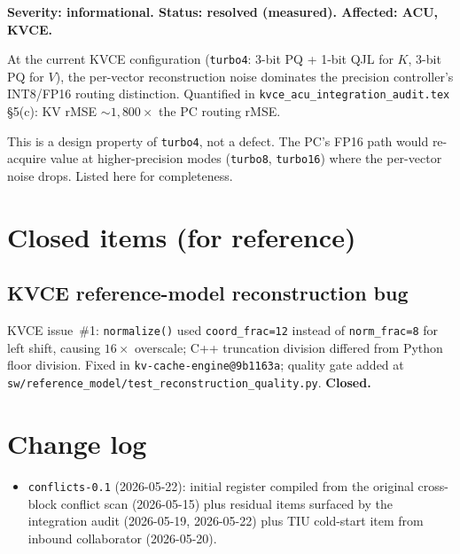 \documentclass[11pt]{article}
\begin{document}
\textbf{Severity: informational. Status: resolved (measured). Affected: ACU, KVCE.}

At the current KVCE configuration (\texttt{turbo4}: 3-bit PQ +
1-bit QJL for $K$, 3-bit PQ for $V$), the per-vector reconstruction
noise dominates the precision controller's INT8/FP16 routing
distinction. Quantified in
\texttt{kvce\_acu\_integration\_audit.tex} \S5(c): KV rMSE
$\sim 1{,}800\times$ the PC routing rMSE.

This is a design property of \texttt{turbo4}, not a defect. The
PC's FP16 path would re-acquire value at higher-precision modes
(\texttt{turbo8}, \texttt{turbo16}) where the per-vector noise
drops. Listed here for completeness.

\section{Closed items (for reference)}
\label{sec:closed}

\subsection*{KVCE reference-model reconstruction bug}

KVCE issue~\#1: \texttt{normalize()} used \texttt{coord\_frac=12}
instead of \texttt{norm\_frac=8} for left shift, causing $16\times$
overscale; C++ truncation division differed from Python
floor division. Fixed in \texttt{kv-cache-engine@9b1163a}; quality
gate added at \texttt{sw/reference\_model/test\_reconstruction\_quality.py}.
\textbf{Closed.}

\section*{Change log}

\begin{itemize}
\item \texttt{conflicts-0.1} (2026-05-22): initial register compiled
from the original cross-block conflict scan
(2026-05-15) plus residual items surfaced by the integration audit
(2026-05-19, 2026-05-22) plus TIU cold-start item from inbound
collaborator (2026-05-20).
\end{itemize}
\end{document}
